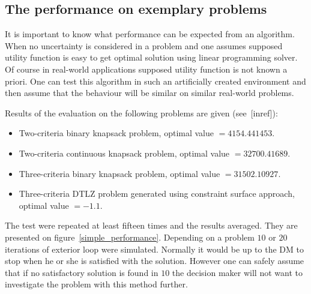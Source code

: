\clearpage{}
\subsection{The performance on exemplary problems}
\label{nouncert-performance}
It is important to know what performance can be expected from an
algorithm. When no uncertainty is considered in a problem and one assumes
supposed utility function is easy to get optimal solution using linear
programming solver. Of course in real-world applications supposed utility
function is not known a priori. One can test this algorithm in such an
artificially created environment and then assume that the behaviour will be
similar on similar real-world problems.

Results of the evaluation on the following problems are given (see~[inref]):
\begin{itemize}
\item Two-criteria binary knapsack problem, optimal value $= 4154.441453$.
\item Two-criteria continuous knapsack problem, optimal value $= 32700.41689$.
\item Three-criteria binary knapsack problem, optimal value $= 31502.10927$.
\item Three-criteria DTLZ problem generated using constraint surface approach, optimal value $= -1.1$.
\end{itemize}

The test were repeated at least fifteen times and the results averaged. They
are presented on figure~\ref{simple_performance}. Depending on a problem $10$
or $20$ iterations of exterior loop were simulated. Normally it would be up to
the DM to stop when he or she is satisfied with the solution. However one can
safely assume that if no satisfactory solution is found in $10$ the decision
maker will not want to investigate the problem with this method further.

